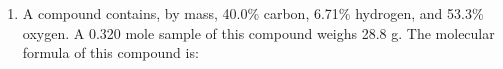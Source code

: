 \documentclass[main.tex]{subfiles}
\begin{document}
\begin{fullwidth}
\begin{multicols*}{2}
\begin{enumerate}
\item A compound contains, by mass, 40.0\% carbon, 6.71\% hydrogen, and 53.3\% oxygen. A 0.320 mole sample of this compound weighs 28.8 g. The molecular formula of this compound is:
 \begin{enumerate}[label=(\alph*)]\vspace{-0.5cm}
\end{enumerate}\vspace{-0.5cm}





\end{enumerate}
\end{multicols*}
\end{fullwidth}
\end{document}
